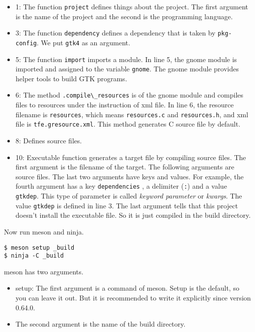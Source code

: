 \begin{itemize}
\tightlist
\item
  1: The function \passthrough{\lstinline!project!} defines things about
  the project. The first argument is the name of the project and the
  second is the programming language.
\item
  3: The function \passthrough{\lstinline!dependency!} defines a
  dependency that is taken by \passthrough{\lstinline!pkg-config!}. We
  put \passthrough{\lstinline!gtk4!} as an argument.
\item
  5: The function \passthrough{\lstinline!import!} imports a module. In
  line 5, the gnome module is imported and assigned to the variable
  \passthrough{\lstinline!gnome!}. The gnome module provides helper
  tools to build GTK programs.
\item
  6: The method \passthrough{\lstinline!.compile\_resources!} is of the
  gnome module and compiles files to resources under the instruction of
  xml file. In line 6, the resource filename is
  \passthrough{\lstinline!resources!}, which means
  \passthrough{\lstinline!resources.c!} and
  \passthrough{\lstinline!resources.h!}, and xml file is
  \passthrough{\lstinline!tfe.gresource.xml!}. This method generates C
  source file by default.
\item
  8: Defines source files.
\item
  10: Executable function generates a target file by compiling source
  files. The first argument is the filename of the target. The following
  arguments are source files. The last two arguments have keys and
  values. For example, the fourth argument has a key
  \passthrough{\lstinline!dependencies!} , a delimiter
  (\passthrough{\lstinline!:!}) and a value
  \passthrough{\lstinline!gtkdep!}. This type of parameter is called
  \emph{keyword parameter} or \emph{kwargs}. The value
  \passthrough{\lstinline!gtkdep!} is defined in line 3. The last
  argument tells that this project doesn't install the executable file.
  So it is just compiled in the build directory.
\end{itemize}

Now run meson and ninja.

\begin{lstlisting}
$ meson setup _build
$ ninja -C _build
\end{lstlisting}

meson has two arguments.

\begin{itemize}
\tightlist
\item
  setup: The first argument is a command of meson. Setup is the default,
  so you can leave it out. But it is recommended to write it explicitly
  since version 0.64.0.
\item
  The second argument is the name of the build directory.
\end{itemize}

